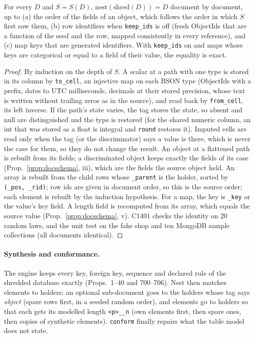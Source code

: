 \begin{proposition}\label{prop:docshred}
For every $D$ and $S=S(D)$, $\mathrm{nest}(\mathrm{shred}(D))=D$ document by document, up to (a) the order of the
fields of an object, which follows the order in which $S$ first saw them, (b) row identifiers when
\texttt{keep\_ids} is off (fresh ObjectIds that are a function of the seed and the row, mapped consistently in every
reference), and (c) map keys that are generated identifiers. With \texttt{keep\_ids} on and maps whose keys are
categorical or equal to a field of their value, the equality is exact.
\end{proposition}
\begin{proof}
By induction on the depth of $S$. A scalar at a path with one type is stored in its column by \texttt{to\_cell},
an injective map on each BSON type (ObjectIds with a prefix, dates to UTC milliseconds, decimals at their stored
precision, whose text is written without trailing zeros as in the source), and read back by \texttt{from\_cell}, its
left inverse. If the path's state varies, the tag stores the state, so absent and null are distinguished and the
type is restored (for the shared numeric column, an int that was stored as a float is integral and
\texttt{round} restores it). Imputed cells are read only when the tag (or the discriminator) says a value is there,
which is never the case for them, so they do not change the result. An object at a flattened path is rebuilt from
its fields; a discriminated object keeps exactly the fields of its case (Prop.~\ref{prop:docschema}, iii), which
are the fields the source object held. An array is rebuilt from the child rows whose \texttt{\_parent} is the
holder, sorted by \texttt{(\_pos, \_rid)}; row ids are given in document order, so this is the source order; each
element is rebuilt by the induction hypothesis. For a map, the key is \texttt{\_key} or the value's key field. A
length field is recomputed from its array, which equals the source value (Prop.~\ref{prop:docschema}, v). C1401
checks the identity on 20 random laws, and the unit test on the fake shop and ten MongoDB sample collections (all
documents identical).
\end{proof}

\paragraph{Synthesis and conformance.} The engine keeps every key, foreign key, sequence and declared rule of the
shredded database exactly (Props.~1--40 and 700--706). Nest then matches elements to holders: an optional
sub-document goes to the holders whose tag says \emph{object} (spare rows first, in a seeded random order), and
elements go to holders so that each gets its modelled length \texttt{<p>\_\_n} (own elements first, then spare
ones, then copies of synthetic elements). \texttt{conform} finally repairs what the table model does not state.

